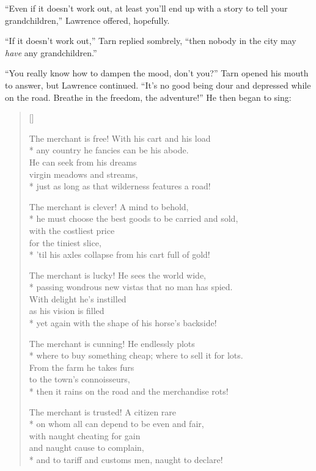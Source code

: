 ``Even if it doesn't work out, at least you'll end up with a story to tell your grandchildren,'' Lawrence offered, hopefully.

``If it doesn't work out,'' Tarn replied sombrely, ``then nobody in the city may \emph{have} any grandchildren.''

``You really know how to dampen the mood, don't you?''  Tarn opened his mouth to answer, but Lawrence continued. ``It's no good being dour and depressed while on the road.  Breathe in the freedom, the adventure!''  He then began to sing:

\settowidth{\versewidth}{The merchant is free! With his cart and his load}
\begin{verse}[\versewidth]
\begin{patverse*}
The merchant is free! With his cart and his load\\*
any country he fancies can be his abode.\\
He can seek from his dreams\\
virgin meadows and streams,\\*
just as long as that wilderness features a road!

The merchant is clever!  A mind to behold,\\*
he must choose the best goods to be carried and sold,\\
with the costliest price\\
for the tiniest slice,\\*
'til his axles collapse from his cart full of gold!

The merchant is lucky!  He sees the world wide,\\*
passing wondrous new vistas that no man has spied.\\
With delight he's instilled\\
as his vision is filled\\*
yet again with the shape of his horse's backside!

The merchant is cunning!  He endlessly plots\\*
where to buy something cheap; where to sell it for lots.\\
From the farm he takes furs\\
to the town's connoisseurs,\\*
then it rains on the road and the merchandise rots!

The merchant is trusted!  A citizen rare\\*
on whom all can depend to be even and fair,\\
with naught cheating for gain\\
and naught cause to complain,\\*
and to tariff and customs men, naught to declare!


\end{patverse*}
\end{verse}
